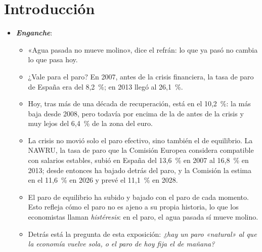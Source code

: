 \documentclass[11pt]{article}
\begin{document}
\tceetitulo

\section*{Introducción}

\begin{itemize}
\item \textbf{\emph{Enganche}}:
  \begin{itemize}
  \item «Agua pasada no mueve molino», dice el refrán: lo que ya pasó no cambia lo que pasa hoy.
  \item ¿Vale para el paro? En 2007, antes de la crisis financiera, la tasa de paro de España era del 8,2~\%; en 2013 llegó al 26,1~\%\nocite{CE2026AMECOParo}.
  \item Hoy, tras más de una década de recuperación, está en el 10,2~\%\nocite{INE2026EPA3T}: la más baja desde 2008, pero todavía por encima de la de antes de la crisis y muy lejos del 6,4~\% de la zona del euro\nocite{CE2026AMECOParo}.
  \item La crisis no movió solo el paro efectivo, sino también el de equilibrio. La NAWRU, la tasa de paro que la Comisión Europea considera compatible con salarios estables, subió en España del 13,6~\% en 2007 al 16,8~\% en 2013; desde entonces ha bajado detrás del paro, y la Comisión la estima en el 11,6~\% en 2026 y prevé el 11,1~\% en 2028\nocite{CE2026AMECO}.
  \item El paro de equilibrio ha subido y bajado con el paro de cada momento. Esto refleja cómo el paro no es ajeno a su propia historia, lo que los economistas llaman \emph{histéresis}: en el paro, el agua pasada sí mueve molino.
  \item Detrás está la pregunta de esta exposición: \emph{¿hay un paro «natural» al que la economía vuelve sola, o el paro de hoy fija el de mañana?}
  \end{itemize}


\end{itemize}
\end{document}
